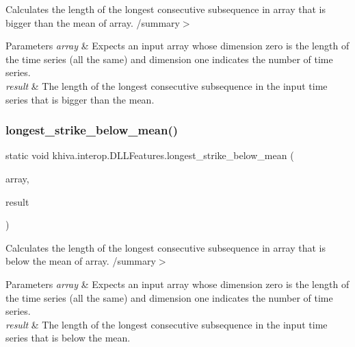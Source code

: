 Calculates the length of the longest consecutive subsequence in array that is bigger than the mean of array. /summary$>$ 
\begin{DoxyParams}{Parameters}
{\em array} & Expects an input array whose dimension zero is the length of the time series (all the same) and dimension one indicates the number of time series.\\
\hline
{\em result} & The length of the longest consecutive subsequence in the input time series that is bigger than the mean.\\
\hline
\end{DoxyParams}


\mbox{\label{classkhiva_1_1interop_1_1_d_l_l_features_a49f978188a34926c68faa4653b9c3f00}} 
\subsubsection{\texorpdfstring{longest\+\_\+strike\+\_\+below\+\_\+mean()}{longest\_strike\_below\_mean()}}
{\footnotesize\ttfamily static void khiva.\+interop.\+D\+L\+L\+Features.\+longest\+\_\+strike\+\_\+below\+\_\+mean (\begin{DoxyParamCaption}\item[{\mbox{[}\+In\mbox{]} ref Int\+Ptr}]{array,  }\item[{\mbox{[}\+Out\mbox{]} out Int\+Ptr}]{result }\end{DoxyParamCaption})\hspace{0.3cm}{\ttfamily [static]}}



Calculates the length of the longest consecutive subsequence in array that is below the mean of array. /summary$>$ 
\begin{DoxyParams}{Parameters}
{\em array} & Expects an input array whose dimension zero is the length of the time series (all the same) and dimension one indicates the number of time series.\\
\hline
{\em result} & The length of the longest consecutive subsequence in the input time series that is below the mean.\\
\hline
\end{DoxyParams}


